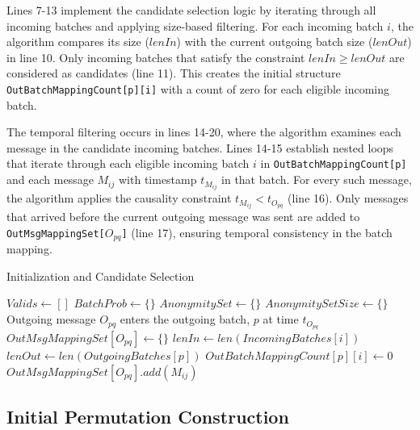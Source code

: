 \documentclass{article}
\begin{document}
Lines 7-13 implement the candidate selection 
logic by iterating through all incoming batches 
and applying size-based filtering. For each 
incoming batch $i$, the algorithm compares 
its size ($lenIn$) with the current outgoing 
batch size ($lenOut$) in line 10. Only 
incoming batches that satisfy the 
constraint $lenIn \geq lenOut$ are 
considered as candidates (line 11). This creates the 
initial structure \texttt{OutBatchMappingCount[p][i]} 
with a count of zero for each eligible incoming batch.

The temporal filtering occurs in lines 14-20, 
where the algorithm examines each message in the 
candidate incoming batches. Lines 14-15 establish 
nested loops that iterate through each eligible 
incoming batch $i$ in \texttt{OutBatchMappingCount[p]} 
and each message $M_{ij}$ with timestamp $t_{M_{ij}}$ 
in that batch. For every such message, the algorithm 
applies the causality 
constraint $t_{M_{ij}} < t_{O_{pq}}$ (line 16). 
Only messages that arrived before the current 
outgoing message was sent are added 
to \texttt{OutMsgMappingSet[$O_{pq}$]} (line 17), 
ensuring temporal consistency in the batch mapping.


\begin{algorithm}
\caption{Initialization and Candidate Selection}
\label{alg:phase1}
\begin{algorithmic}[1]
\State $Valids \gets [] $
\State $BatchProb \gets \{ \} $
\State $ AnonymitySet \gets \{ \} $
\State $ AnonymitySetSize \gets \{ \} $
\State Outgoing message $O_{pq}$ enters the outgoing batch, $p$ at time $t_{O_{pq}}$
\State $OutMsgMappingSet [O_{pq}] \gets \{ \} $
    \State $ lenIn \gets len(IncomingBatches[i]) $
    \State $ lenOut \gets len(OutgoingBatches[p]) $
        \State $OutBatchMappingCount[p][i] \gets 0 $
    \EndIf
\EndFor
{}
            \State $ OutMsgMappingSet[O_{pq}].add(M_{ij}) $
        \EndIf
    \EndFor
\EndFor
\end{algorithmic}
\end{algorithm}

\subsection{Initial Permutation Construction}

\end{document}
